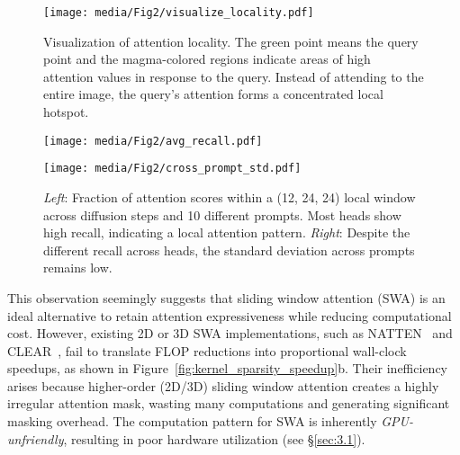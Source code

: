 \begin{figure}[t!]
    \centering
    \begin{minipage}[b]{1\columnwidth}
        \centering
        \texttt{[image: media/Fig2/visualize\_locality.pdf]}
    \end{minipage}
    \caption{Visualization of attention locality. The green point means the query point and the magma-colored regions indicate areas of high attention values in response to the query. Instead of attending to the entire image, the query's attention forms a concentrated local hotspot.}
    \label{fig:visualize_locality}
\end{figure}


\begin{figure}[ht]
    \centering
    \begin{minipage}[b]{0.49\columnwidth}
        \centering
        \texttt{[image: media/Fig2/avg\_recall.pdf]}
    \end{minipage}
    \hfill
    \begin{minipage}[b]{0.49\columnwidth}
        \centering
        \texttt{[image: media/Fig2/cross\_prompt\_std.pdf]}
    \end{minipage}    
    \caption{\textit{Left}: Fraction of attention scores within a (12, 24, 24) local window across diffusion steps and 10 different prompts. Most heads show high recall, indicating a local attention pattern.
\textit{Right}: Despite the different recall across heads, the standard deviation across prompts remains low.}
    \label{fig:attention_analysis}
\end{figure}




This observation seemingly suggests that sliding window attention (SWA) is an ideal alternative to retain attention expressiveness while reducing computational cost. However, existing 2D or 3D SWA implementations, such as NATTEN~\citep{hassani2023neighborhood} and CLEAR~\citep{liu2024clearconvlikelinearizationrevs}, fail to translate FLOP reductions into proportional wall-clock speedups, as shown in Figure~\ref{fig:kernel_sparsity_speedup}b. Their inefficiency arises because higher-order (2D/3D) sliding window attention creates a highly irregular attention mask, wasting many computations and generating significant masking overhead. The computation pattern for SWA is inherently \emph{GPU-unfriendly}, resulting in poor hardware utilization (see \S\ref{sec:3.1}).  

